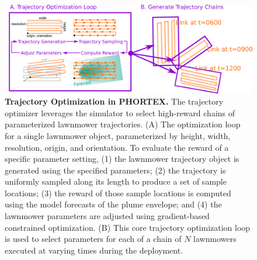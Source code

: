 \begin{figure}[h!]
    \centering
    \includegraphics[width=1\columnwidth]{figures/phortex_to.png}
    \caption[Trajectory optimization in \PHORTEX.]{\textbf{Trajectory Optimization in PHORTEX.} The trajectory optimizer leverages the \PHUMES simulator to select high-reward chains of parameterized lawnmower trajectories. (A) The optimization loop for a single lawnmower object, parameterized by height, width, resolution, origin, and orientation. To evaluate the reward of a specific parameter setting, (1) the lawnmower trajectory object is generated using the specified parameters; (2) the trajectory is uniformly sampled along its length to produce a set of sample locations; (3) the reward of those sample locations is computed using the \PHUMES model forecasts of the plume envelope; and (4) the lawnmower parameters are adjusted using gradient-based constrained optimization. (B) This core trajectory optimization loop is used to select parameters for each of a chain of $N$ lawnmowers executed at varying times during the deployment.}
    \label{fig:traj_opt}
\end{figure}

